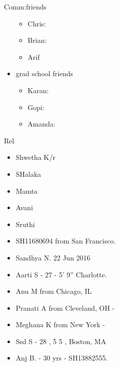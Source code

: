 \documentclass[serif, mathserif, final]{beamer}
\begin{document}
\begin{frame}[label=socialInt]
\begin{block}{Comm:friends}
\begin{itemize}
\begin{itemize}
          \item \tiny Chris: 
          \item \tiny Brian: 
          \item \tiny Arif 
          \end{itemize}
        \item grad school friends 
          \begin{itemize} 
            \tiny \item \tiny  Karan: 
          \item \tiny Gopi: 
          \item \tiny Amanda:  
          \end{itemize}
        \end{itemize} 
      \end{block}
      
      \begin{block}{Rel} 
        \begin{itemize} 
          \small \item \small Shwetha K/r
        \item \small SHalaka 
        \item \small Mamta
        \item \small Avani 
        \item \small Sruthi 
        \item \small SH11680694 from San Francisco. 
        \item \small Sandhya N. 22 Jun 2016 
        \item \small Aarti S - 27 - 5' 9'' Charlotte.       
        \item \small Anu M from Chicago, IL 
        \item \small Pranati A from Cleveland, OH - 
        \item \small Meghana K from New York - 
        \item \small Ssd S - 28 , 5 5 , Boston, MA 
        \item \small Anj B. - 30 yrs - SH13882555.
        \end{itemize}
      \end{block}
\end{frame}
\end{document}
